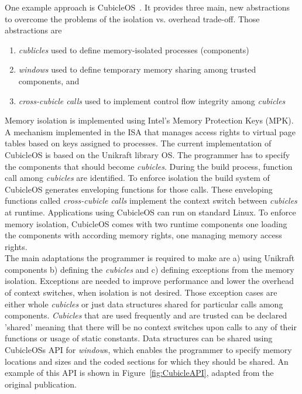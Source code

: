 One example approach is CubicleOS~\cite{sartakov2021cubicleos}. It provides three main, new abstractions to overcome the problems of the isolation vs. overhead trade-off. Those abstractions are 
\begin{enumerate}
    \item \emph{cublicles} used to define memory-isolated processes (components)
    \item \emph{windows} used to define temporary memory sharing among trusted components, and
    \item \emph{cross-cubicle calls} used to implement control flow integrity among \emph{cubicles}
\end{enumerate}
Memory isolation is implemented using Intel's Memory Protection Keys (MPK)\cite{intel64and}. A mechanism implemented in the ISA that manages access rights to virtual page tables based on keys assigned to processes. The current implementation of CubicleOS is based on the Unikraft library OS\cite{kuenzer2021unikraft}. The programmer has to specify the components that should become \emph{cubicles}. During the build process, function call among \emph{cubicles} are identified. To enforce isolation the build system of CubicleOS generates enveloping functions for those calls. These enveloping functions 
called \emph{cross-cubicle calls} implement the context switch between \emph{cubicles} at runtime. Applications using CubicleOS can run on standard Linux. To enforce memory isolation, CubicleOS comes with two runtime components one loading the components with according memory rights, one managing memory access rights. \\
The main adaptations the programmer is required to make are a) using Unikraft components b) defining the \emph{cubicles} and c) defining exceptions from the memory isolation. Exceptions are needed to improve performance and lower the overhead of context switches, when isolation is not desired. Those exception cases are either whole \emph{cubicles} or just data structures shared for particular calls among components. \emph{Cubicles} that are used frequently and are trusted can be declared 'shared' meaning  that there will be no context switches upon calls to any of their functions or usage of static constants. Data structures can be shared using CubicleOSs API for \emph{window}s, which enables the programmer to specify memory locations and sizes and the coded sections for which they should be shared. An example of this API is shown in Figure~\ref{fig:CubicleAPI}, adapted from the original publication.


